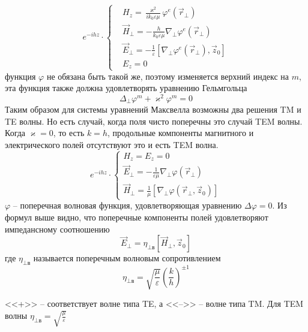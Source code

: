 \documentclass[a4paper,14pt]{extarticle}
\renewcommand{\phi}{\varphi}
\renewcommand{\epsilon}{\varepsilon}
\renewcommand{\kappa}{\varkappa}
\begin{document}
\begin{equation}
	e^{-ihz}\cdot\left\{
	\begin{aligned}
		&H_z = \frac{\kappa^2}{ik_0\epsilon\mu}\phi^e(\vec{r}_\perp) \\
		&\vec{H}_\perp = -\frac{h}{k_0\epsilon\mu}\nabla_\perp\phi^e(\vec{r}_\perp) \\
		&\vec{E}_\perp = -\frac{1}{\epsilon}[\nabla_\perp\phi^e(\vec{r}_\perp),\vec{z}_0] \\
		&E_z = 0
	\end{aligned}\right.
\end{equation}
функция $\phi$ не обязана быть такой же, поэтому изменяется верхний индекс на $m$, эта функция также должна удовлетворять уравнению Гельмгольца  
\begin{equation}
	\Delta_\perp\phi^{m} + \kappa^2\phi^{m}=0
\end{equation}
Таким образом для системы уравнений Максвелла возможны два решения TM и TE волны. Но есть случай, когда поля чисто поперечны это случай TEM волны.
Когда $\kappa = 0$, то есть $k=h$, продольные компоненты магнитного и электрического полей отсутствуют это и есть TEM волна.
\begin{equation}
	e^{-ihz}\cdot\left\{
	\begin{aligned}
		H_z = E_z = 0\\
		\vec{E}_\perp = -\frac{1}{\epsilon\mu}\nabla_\perp\phi(\vec{r}_\perp)\\
		\vec{H}_\perp = \frac{1}{\mu}[\nabla_\perp\phi(\vec{r}_\perp,\vec{z}_0)]
	\end{aligned}\right.
\end{equation}
$\phi$ -- поперечная волновая функция, удовлетворяющая уравнению $\Delta\phi=0$.
Из формул выше видно, что поперечные компоненты полей удовлетворяют импедансному соотношению
\begin{equation}
	\vec{E}_\perp = \eta_{\perp\text{в}}[\vec{H}_\perp,\vec{z}_0]
\end{equation}
где $\eta_{\perp\text{в}}$ называется поперечным волновым сопротивлением
\begin{equation}
	\eta_{\perp\text{в}}=\sqrt{\frac{\mu}{\epsilon}} \left( \frac{k}{h} \right)^{\pm 1}
\end{equation} 
	
<<+>> -- соответствует волне типа TE, а <<-->> -- волне типа TM. 
Для TEM волны $\displaystyle \eta_{\perp\text{в}}=\sqrt{\frac{\mu}{\epsilon}}$
\end{document}
